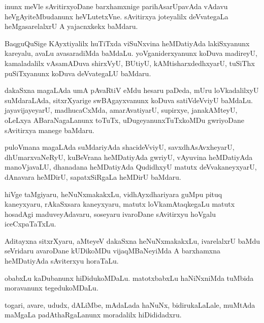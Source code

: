 \documentclass{article}
\begin{document}
\begin{mn}
inunx meVle sAvitirxyoDane barxhamxnige  parihAsarUpavAda vAdavu heVgAyiteMbudanunx heVLutetxVne.  
sAvitirxya joteyalilx deVvategaLa heMgasarelalxrU A yajacnxkekx baMdaru.
\end{mn}

\begin{mn}
BaqguQuSige  KAyxtiyalilx  huTiTxda viSuNxvina  heMDatiyAda  lakiSxyanunx  kareyalu,  
avaLu avasaradiMda  baMdaLu.  yoVganiderxyanunx koDuva  madireyU,  kamaladalilx vAsamADuva 
shirxVyU, BUtiyU, kAMtisharxdedhxyarU,  tuSiThx puSiTxyanunx  koDuva  deVvategaLU baMdaru.
\end{mn}

\begin{mn}
dakaSxna magaLAda umA pAvaRtiV  eMdu hesaru paDeda,  mUru  loVkadalilxyU  suMdaraLAda, 
sitxrXyarige  swBAgayxvanunx  koDuva satiVdeVviyU baMdaLu.  jayavijayeyarU,  madhucaCxMda, 
amarAvatiyarU,  supirxye,  janakAMteyU, oLeLxya ABaraNagaLanunx  toTuTx, 
uDugeyanunxTuTxkoMDu gwriyoDane sAvitirxya manege baMdaru.
\end{mn}

\begin{mn}
puloVmana magaLAda suMdariyAda shacideVviyU, savxdhAsAvxheyarU, dhUmarxvaNeRyU,  
kuBeVrana heMDatiyAda gwriyU,  vAyuvina heMDatiyAda manoVjavaLU, dhanadana heMDatiyAda 
QudidhxyU matutx  deVvakaneyxyarU, dAnavara heMDirU, sapatxSiRgaLa heMDirU baMdaru.
\end{mn}

\begin{mn}
hiVge  taMgiyaru,  heNuNxmakakxLu,  vidhAyxdhariyara  guMpu pituq  kaneyxyaru, 
rAkaSxsara  kaneyxyaru,  matutx  loVkamAtaqkegaLu  matutx hosadAgi  maduveyAdavaru,  
soseyaru  ivaroDane  sAvitirxyu hoVgalu iceCxpaTaTxLu.
\end{mn}

\begin{mn}
Aditayxna  sitxrXyaru,  aMteyeV  dakaSxna  heNuNxmakakxLu,  ivarelalxrU baMdu seVridaru  
avaroDane  kUDikoMDu  vijaqMBaNeyiMda  A barxhamxna heMDatiyAda sAviterxyu horaTaLu.
\end{mn}

\begin{mn}
obabxLu kaDubanunx hiDidukoMDaLu.  matotxbabxLu haNiNxniMda tuMbida moravanunx tegedukoMDaLu. 
\end{mn}

\begin{mn}
togari, avare, ududx, dALiMbe,  mAdaLada haNuNx, bidirukaLaLale, muMtAda  
maMgaLa padAthaRgaLanunx  moradalilx  hiDididadxru.
\end{mn}
\end{document}
